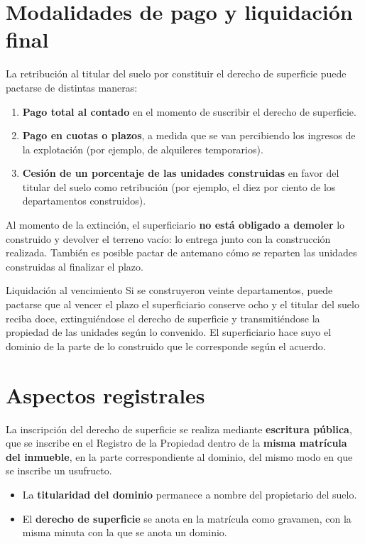 \documentclass[12pt,oneside]{book}
\begin{document}
\section{Modalidades de pago y liquidación final}

La retribución al titular del suelo por constituir el derecho de superficie puede pactarse de distintas maneras:

\begin{enumerate}
    \item \textbf{Pago total al contado} en el momento de suscribir el derecho de superficie.
    \item \textbf{Pago en cuotas o plazos}, a medida que se van percibiendo los ingresos de la explotación (por ejemplo, de alquileres temporarios).
    \item \textbf{Cesión de un porcentaje de las unidades construidas} en favor del titular del suelo como retribución (por ejemplo, el diez por ciento de los departamentos construidos).
\end{enumerate}

Al momento de la extinción, el superficiario \textbf{no está obligado a demoler} lo construido y devolver el terreno vacío: lo entrega junto con la construcción realizada. También es posible pactar de antemano cómo se reparten las unidades construidas al finalizar el plazo.

\begin{example}{Liquidación al vencimiento}
Si se construyeron veinte departamentos, puede pactarse que al vencer el plazo el superficiario conserve ocho y el titular del suelo reciba doce, extinguiéndose el derecho de superficie y transmitiéndose la propiedad de las unidades según lo convenido. El superficiario hace suyo el dominio de la parte de lo construido que le corresponde según el acuerdo.
\end{example}

\section{Aspectos registrales}

La inscripción del derecho de superficie se realiza mediante \textbf{escritura pública}, que se inscribe en el Registro de la Propiedad dentro de la \textbf{misma matrícula del inmueble}, en la parte correspondiente al dominio, del mismo modo en que se inscribe un usufructo.

\begin{itemize}
    \item La \textbf{titularidad del dominio} permanece a nombre del propietario del suelo.
    \item El \textbf{derecho de superficie} se anota en la matrícula como gravamen, con la misma minuta con la que se anota un dominio.
\end{itemize}
\end{document}
